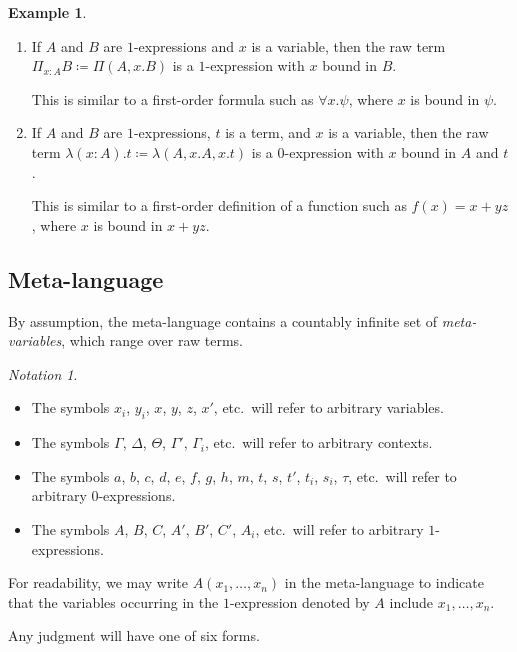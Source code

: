 \documentclass[10pt,letterpaper,cm]{nupset}
\theoremstyle{definition}
\newtheorem{exmp}[definition]{Example}
\theoremstyle{theorem}
\theoremstyle{remark}
\newtheorem*{notation}{Notation}
\newcommand{\0}{\mathbf{0}}
\newcommand{\1}{\mathbf{1}}
\newcommand{\2}{\mathbf{2}}
\newcommand{\bi}{\begin{itemize}}
\newcommand{\ei}{\end{itemize}}
\newcommand{\be}{\begin{enumerate}}
\newcommand{\ee}{\end{enumerate}}
\begin{document}
\begin{exmp} $ $
\be
\item If $A$ and $B$  are $1$-expressions and $x$ is a variable, then the raw term $\Pi_{x:A}B \coloneqq \Pi(A, x.B)$ is a $1$-expression with $x$ bound in $B$. 

This is similar to a first-order formula such as  $\forall{x}.\psi$, where $x$ is bound in $\psi$.  
\item If $A$ and $B$ are $1$-expressions, $t$ is a term, and $x$ is a variable, then the raw term $\lambda(x:A).t \coloneqq \lambda(A, x.A, x.t)$ is a $0$-expression with $x$ bound in $A$ and $t$. 

This is similar to a first-order definition of a function such as $f(x) = x+yz$, where $x$ is bound in $x+yz$.
\ee
\end{exmp}

\subsection*{Meta-language}

By assumption, the meta-language contains a countably infinite set of \textit{meta-variables}, which range over raw terms.  
\begin{notation} $ $
\bi 
\item The symbols $x_i$, $y_i$, $x$, $y$, $z$, $x'$, etc.\  will refer to arbitrary variables. 
\item The symbols $\Gamma$, $\Delta$, $\Theta$, $\Gamma'$, $\Gamma_i$, etc.\  will refer to arbitrary contexts.
\item The symbols $a$, $b$, $c$, $d$, $e$, $f$, $g$, $h$, $m$, $t$, $s$, $t'$, $t_i$, $s_i$, $\tau$, etc.\ will refer to arbitrary $0$-expressions. 
\item The symbols $A$, $B$, $C$, $A'$, $B'$, $C'$, $A_i$, etc.\  will refer to arbitrary $1$-expressions.
\ei
For readability, we may write $A\left(x_1, \ldots, x_n\right)$ in the meta-language to indicate that the variables occurring in the $1$-expression denoted by $A$ include $x_1, \ldots, x_n$.
\end{notation}

\bigskip

Any judgment will have one of six forms.
\end{document}
